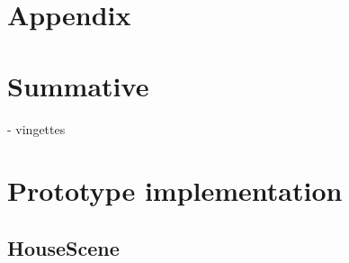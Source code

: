 \chapter{Appendix}

\chapter{Summative}
- vingettes

\chapter{Prototype implementation}

\section{HouseScene}
